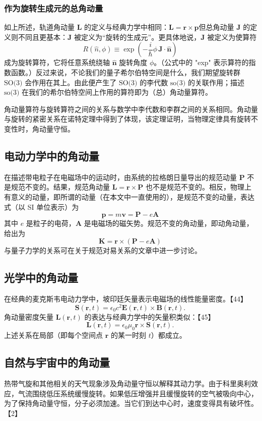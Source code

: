 \subsubsection{作为旋转生成元的总角动量}  
如上所述，轨道角动量 \( \mathbf{L} \) 的定义与经典力学中相同：\(\mathbf{L} = \mathbf{r} \times \mathbf{p}\)但总角动量 \( \mathbf{J} \) 的定义则不同且更基本：\( \mathbf{J} \) 被定义为“旋转的生成元”。更具体地说，\( \mathbf{J} \) 被定义为使算符  
\[
R(\hat{n}, \phi) \equiv \exp\left(-\frac{i}{\hbar} \phi \, \mathbf{J} \cdot \hat{\mathbf{n}}\right)~
\]  
成为旋转算符，它将任意系统绕轴 \( \hat{\mathbf{n}} \) 旋转角度 \( \phi \)。（公式中的 "exp" 表示算符的指数函数。）反过来说，不论我们的量子希尔伯特空间是什么，我们期望旋转群 \( \text{SO(3)} \) 会作用在其上。由此便产生了 \( \text{SO(3)} \) 的李代数 \( \text{so(3)} \) 的关联作用；描述 \( \text{so(3)} \) 在我们的希尔伯特空间上作用的算符即为（总）角动量算符。

角动量算符与旋转算符之间的关系与数学中李代数和李群之间的关系相同。角动量与旋转的紧密关系在诺特定理中得到了体现，该定理证明，当物理定律具有旋转不变性时，角动量守恒。
\subsection{电动力学中的角动量} 
在描述带电粒子在电磁场中的运动时，由系统的拉格朗日量导出的规范动量 \( \mathbf{P} \) 不是规范不变的。结果，规范角动量 \( \mathbf{L} = \mathbf{r} \times \mathbf{P} \) 也不是规范不变的。相反，物理上有意义的动量，即所谓的动量（在本文中一直使用的），是规范不变的动量，表达式（以 SI 单位表示）为  
\[
\mathbf{p} = m \mathbf{v} = \mathbf{P} - e \mathbf{A}~
\]
其中 \( e \) 是粒子的电荷，\( \mathbf{A} \) 是电磁场的磁矢势。规范不变的角动量，即动角动量，给出为  
\[
\mathbf{K} = \mathbf{r} \times (\mathbf{P} - e \mathbf{A})~
\]
与量子力学的关系可在关于规范对易关系的文章中进一步讨论。
\subsection{光学中的角动量 } 
在经典的麦克斯韦电动力学中，坡印廷矢量表示电磁场的线性能量密度。【44】
\[
\mathbf{S} (\mathbf{r}, t) = \epsilon_0 c^2 \mathbf{E} (\mathbf{r}, t) \times \mathbf{B} (\mathbf{r}, t) .~
\]
角动量密度矢量 \( \mathbf{L} (\mathbf{r}, t) \) 的表达与经典力学中的矢量积类似：【45】
\[
\mathbf{L} (\mathbf{r}, t) = \epsilon_0 \mu_0 \mathbf{r} \times \mathbf{S} (\mathbf{r}, t) .~
\]
上述关系在局部（即每个空间点 \( \mathbf{r} \) 的某一时刻 \( t \)）都成立。
\subsection{自然与宇宙中的角动量}  
热带气旋和其他相关的天气现象涉及角动量守恒以解释其动力学。由于科里奥利效应，气流围绕低压系统缓慢旋转。如果低压增强并且缓慢旋转的空气被吸向中心，为了保持角动量守恒，分子必须加速。当它们到达中心时，速度变得具有破坏性。【2】

